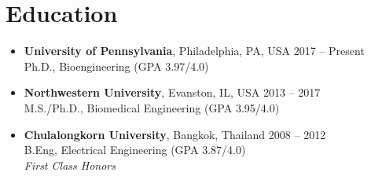 \section{\sc Education}

\begin{itemize}[leftmargin=0cm, label={}]

\item {\bf University of Pennsylvania}, Philadelphia, PA, USA \hfill 2017 -- Present \\
Ph.D., Bioengineering \hfill (GPA 3.97/4.0)

\item {\bf Northwestern University}, Evanston, IL, USA \hfill 2013 -- 2017 \\
M.S./Ph.D., Biomedical Engineering \hfill (GPA 3.95/4.0)

\item {\bf Chulalongkorn University}, Bangkok, Thailand \hfill 2008 -- 2012 \\
B.Eng, Electrical Engineering \hfill (GPA 3.87/4.0)\\
{\em First Class Honors}

\end{itemize}
